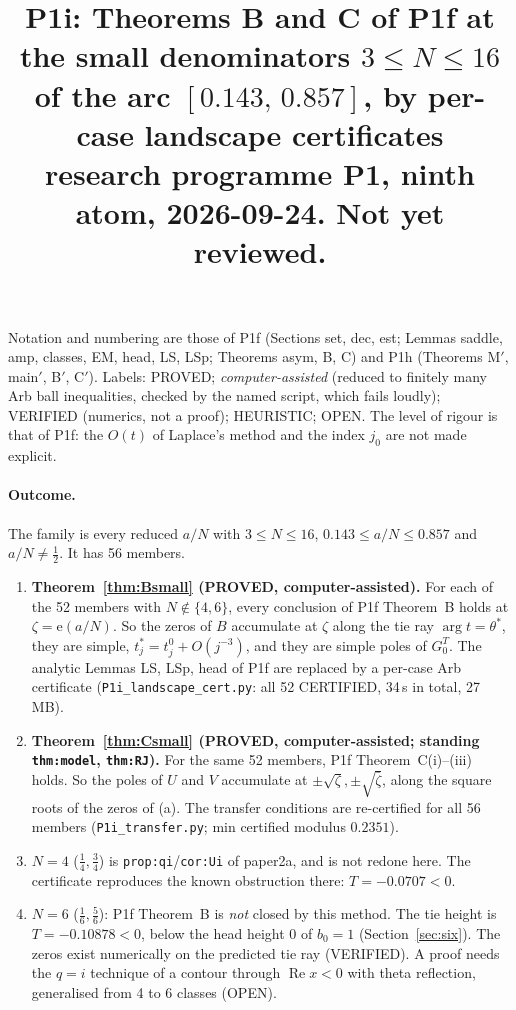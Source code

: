 \documentclass[11pt]{article}
\title{P1i: Theorems B and C of P1f at the small denominators $3\le N\le16$\\ of the arc $[0.143,\,0.857]$, by per-case landscape certificates\\
\small research programme P1, ninth atom, 2026-09-24. Not yet reviewed.}
\date{}
\theoremstyle{remark}\newtheorem{remark}[theorem]{Remark}
\newcommand{\e}{\mathrm{e}}
\begin{document}
\maketitle

Notation and numbering are those of P1f (Sections set, dec, est; Lemmas saddle, amp, classes, EM, head, LS, LSp; Theorems asym, B, C) and P1h (Theorems M$'$, main$'$, B$'$, C$'$).
Labels: PROVED; \emph{computer-assisted} (reduced to finitely many Arb ball inequalities, checked by the named script, which fails loudly); VERIFIED (numerics, not a proof); HEURISTIC; OPEN.
The level of rigour is that of P1f: the $O(t)$ of Laplace's method and the index $j_0$ are not made explicit.

\paragraph{Outcome.} The family is every reduced $a/N$ with $3\le N\le16$, $0.143\le a/N\le0.857$ and $a/N\ne\frac12$. It has 56 members.
\begin{enumerate}
\item[(a)] \textbf{Theorem~\ref{thm:Bsmall} (PROVED, computer-assisted).} For each of the 52 members with $N\notin\{4,6\}$, every conclusion of P1f Theorem~B holds at $\zeta=\e(a/N)$. So the zeros of $B$ accumulate at $\zeta$ along the tie ray $\arg t=\theta^*$, they are simple, $t^*_j=t^0_j+O(j^{-3})$, and they are simple poles of $G^T_0$. The analytic Lemmas LS, LSp, head of P1f are replaced by a per-case Arb certificate (\texttt{P1i\_landscape\_cert.py}: all 52 CERTIFIED, 34\,s in total, 27\,MB).
\item[(b)] \textbf{Theorem~\ref{thm:Csmall} (PROVED, computer-assisted; standing \texttt{thm:model}, \texttt{thm:RJ}).} For the same 52 members, P1f Theorem~C(i)--(iii) holds. So the poles of $U$ and $V$ accumulate at $\pm\sqrt\zeta,\pm\sqrt{\bar\zeta}$, along the square roots of the zeros of (a). The transfer conditions are re-certified for all 56 members (\texttt{P1i\_transfer.py}; min certified modulus $0.2351$).
\item[(c)] \textbf{$N=4$} ($\frac14,\frac34$) is \texttt{prop:qi}/\texttt{cor:Ui} of paper2a, and is not redone here. The certificate reproduces the known obstruction there: $T=-0.0707<0$.
\item[(d)] \textbf{$N=6$} ($\frac16,\frac56$): P1f Theorem~B is \emph{not} closed by this method. The tie height is $T=-0.10878<0$, below the head height $0$ of $b_0=1$ (Section~\ref{sec:six}). The zeros exist numerically on the predicted tie ray (VERIFIED). A proof needs the $q=i$ technique of a contour through $\operatorname{Re}x<0$ with theta reflection, generalised from 4 to 6 classes (OPEN).
\end{enumerate}
\end{document}
